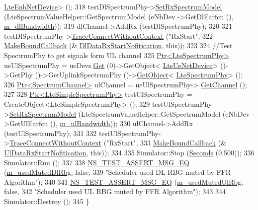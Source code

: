 \begin{DoxyCode}
      \hyperlink{classns3_1_1LteEnbNetDevice}{LteEnbNetDevice}> ();
318   testDlSpectrumPhy->\hyperlink{classns3_1_1LteSimpleSpectrumPhy_a1cbc14b5951a6c9360d3b180760429d9}{SetRxSpectrumModel} (LteSpectrumValueHelper::GetSpectrumModel (eNbDev
      ->GetDlEarfcn (), \hyperlink{classLteFrTestCase_ab4b1f8a24761500e981be4188f37e4a7}{m\_dlBandwidth}));
319   dlChannel->AddRx (testDlSpectrumPhy);
320 
321   testDlSpectrumPhy->\hyperlink{classns3_1_1ObjectBase_a1be45f6fd561e75dcac9dfa81b2b81e4}{TraceConnectWithoutContext} (\textcolor{stringliteral}{"RxStart"},
322                                                  \hyperlink{group__makeboundcallback_ga1725d6362e6065faa0709f7c93f8d770}{MakeBoundCallback} (&
      \hyperlink{lte-test-frequency-reuse_8cc_aaf568764de648457da3536a8940a8510}{DlDataRxStartNofitication}, \textcolor{keyword}{this}));
323 
324   \textcolor{comment}{//Test SpectrumPhy to get signals form UL channel}
325   \hyperlink{classns3_1_1Ptr}{Ptr<LteSpectrumPhy>} ueUlSpectrumPhy = ueDevs.\hyperlink{classns3_1_1NetDeviceContainer_a677d62594b5c9d2dea155cc5045f4d0b}{Get} (0)->GetObject<
      \hyperlink{classns3_1_1LteUeNetDevice}{LteUeNetDevice}> ()->GetPhy ()->GetUplinkSpectrumPhy ()->\hyperlink{classns3_1_1Object_a13e18c00017096c8381eb651d5bd0783}{GetObject}<
      \hyperlink{classns3_1_1LteSpectrumPhy}{LteSpectrumPhy}> ();
326   \hyperlink{classns3_1_1Ptr}{Ptr<SpectrumChannel>} ulChannel = ueUlSpectrumPhy->
      \hyperlink{classns3_1_1LteSpectrumPhy_a50f13e43568687ee32c5d63e5bf639c2}{GetChannel} ();
327 
328   \hyperlink{classns3_1_1Ptr}{Ptr<LteSimpleSpectrumPhy>} testUlSpectrumPhy = CreateObject<LteSimpleSpectrumPhy>
       ();
329   testUlSpectrumPhy->\hyperlink{classns3_1_1LteSimpleSpectrumPhy_a1cbc14b5951a6c9360d3b180760429d9}{SetRxSpectrumModel} (LteSpectrumValueHelper::GetSpectrumModel (eNbDev
      ->GetUlEarfcn (), \hyperlink{classLteFrTestCase_abc41d1a6e64783aec279b400fc5e0076}{m\_ulBandwidth}));
330   ulChannel->AddRx (testUlSpectrumPhy);
331 
332   testUlSpectrumPhy->\hyperlink{classns3_1_1ObjectBase_a1be45f6fd561e75dcac9dfa81b2b81e4}{TraceConnectWithoutContext} (\textcolor{stringliteral}{"RxStart"},
333                                                  \hyperlink{group__makeboundcallback_ga1725d6362e6065faa0709f7c93f8d770}{MakeBoundCallback} (&
      \hyperlink{lte-test-frequency-reuse_8cc_ae8691768e5cb30db2389ac11752ce7b3}{UlDataRxStartNofitication}, \textcolor{keyword}{this}));
334 
335   Simulator::Stop (\hyperlink{group__timecivil_ga33c34b816f8ff6628e33d5c8e9713b9e}{Seconds} (0.500));
336   Simulator::Run ();
337 
338   \hyperlink{group__testing_ga2a9d78cffb3db8e867c35fff0b698cf5}{NS\_TEST\_ASSERT\_MSG\_EQ} (\hyperlink{classLteFrTestCase_a57b4d14dd22adfb64572dce3602703e2}{m\_usedMutedDlRbg}, \textcolor{keyword}{false},
339                          \textcolor{stringliteral}{"Scheduler used DL RBG muted by FFR Algorithm"});
340 
341   \hyperlink{group__testing_ga2a9d78cffb3db8e867c35fff0b698cf5}{NS\_TEST\_ASSERT\_MSG\_EQ} (\hyperlink{classLteFrTestCase_ae54b6fb11ce52cc697928f18f6a4e6c2}{m\_usedMutedUlRbg}, \textcolor{keyword}{false},
342                          \textcolor{stringliteral}{"Scheduler used UL RBG muted by FFR Algorithm"});
343 
344   Simulator::Destroy ();
345 \}
\end{DoxyCode}


